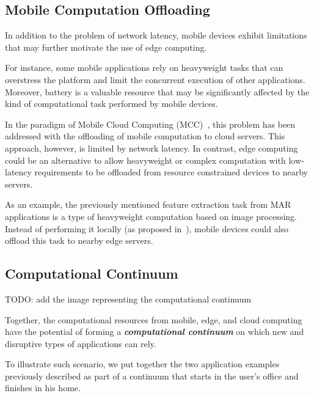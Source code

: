 \subsection{Mobile Computation Offloading}

In addition to the problem of network latency, mobile devices exhibit limitations that may further motivate the use of edge computing. 

For instance, some mobile applications rely on heavyweight tasks that can overstress the platform and limit the concurrent execution of other applications. Moreover, battery is a valuable resource that may be significantly affected by the kind of computational task performed by mobile devices. 

In the paradigm of Mobile Cloud Computing (MCC)~\cite{}, this problem has been addressed with the offloading of mobile computation to cloud servers. This approach, however, is limited by network latency. In contrast, edge computing could be an alternative to allow heavyweight or complex computation with low-latency requirements to be offloaded from resource constrained devices to nearby servers.


As an example, the previously mentioned feature extraction task from MAR applications is a type of heavyweight computation based on image processing. Instead of performing it locally (as proposed in~\cite{}), mobile devices could also offload this task to nearby edge servers. 

\subsection{Computational Continuum}

TODO: add the image representing the computational continuum

Together, the computational resources from mobile, edge, and cloud computing have the potential of forming a \textit{\textbf{computational continuum}} on which new and disruptive types of applications can rely. 

To illustrate such scenario, we put together the two application examples previously described as part of a continuum that starts in the user's office and finishes in his home. 

